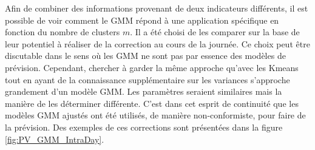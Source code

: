 \documentclass[12pt, french]{report}
\begin{document}
Afin de combiner des informations provenant de deux indicateurs différents, il est possible de voir comment le GMM répond à une application spécifique en fonction du nombre de clusters $m$. Il a été choisi de les comparer sur la base de leur potentiel à réaliser de la correction au cours de la journée. Ce choix peut être discutable dans le sens où les GMM ne sont pas par essence des modèles de prévision. Cependant, chercher à garder la même approche qu'avec les Kmeans tout en ayant de la connaissance supplémentaire sur les variances s'approche grandement d'un modèle GMM. Les paramètres seraient similaires mais la manière de les déterminer différente. C'est dans cet esprit de continuité que les modèles GMM ajustés ont été utilisés, de manière non-conformiste, pour faire de la prévision. Des exemples de ces corrections sont présentées dans la figure \ref{fig:PV_GMM_IntraDay}.
\end{document}
